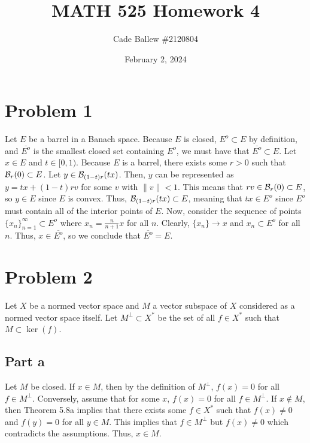 \documentclass{article}
\title{MATH 525 Homework 4}
\author{Cade Ballew \#2120804}
\date{February 2, 2024}
\begin{document}
	
\maketitle
	
\section{Problem 1}
Let $E$ be a barrel in a Banach space. Because $E$ is closed, $E^o\subset E$ by definition, and $\overline{E^o}$ is the smallest closed set containing $E^o$, we must have that $\overline{E^o}\subset E$. Let $x\in E$ and $t\in[0,1)$. Because $E$ is a barrel, there exists some $r>0$ such that ${\cal B}_r(0)\subset E$. Let $y\in{\cal B}_{(1-t)r}(tx)$. Then, $y$ can be represented as $y=tx+(1-t)rv$ for some $v$ with $\|v\|<1$. This means that $rv\in{\cal B}_r(0)\subset E$, so $y\in E$ since $E$ is convex. Thus, ${\cal B}_{(1-t)r}(tx)\subset E$, meaning that $tx\in E^o$ since $E^o$ must contain all of the interior points of $E$. Now, consider the sequence of points $\{x_n\}_{n=1}^\infty\subset E^o$ where $x_n=\frac{n}{n+1}x$ for all $n$. Clearly, $\{x_n\}\to x$ and $x_n\subset E^o$ for all $n$. Thus, $x\in\overline{E^o}$, so we conclude that $\overline{E^o}=E$. 

\section{Problem 2}
Let $X$ be a normed vector space and $M$ a vector subspace of $X$ considered as a normed vector space itself. Let $M^\perp\subset X^*$ be the set of all $f\in X^*$ such that $M\subset\ker(f)$.
 
\subsection{Part a}
Let $M$ be closed. If $x\in M$, then by the definition of $M^\perp$, $f(x)=0$ for all $f\in M^\perp$. Conversely, assume that for some $x$, $f(x)=0$ for all $f\in M^\perp$. If $x\notin M$, then Theorem 5.8a implies that there exists some $f\in X^*$ such that $f(x)\neq 0$ and $f(y)=0$ for all $y\in M$. This implies that $f\in M^\perp$ but $f(x)\neq 0$ which contradicts the assumptions. Thus, $x\in M$.
\end{document}
